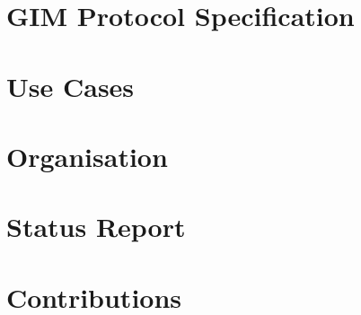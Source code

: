 \appendix
\chapter{GIM Protocol Specification}


\chapter{Use Cases}


\chapter{Organisation}


\chapter{Status Report}


\chapter{Contributions}

